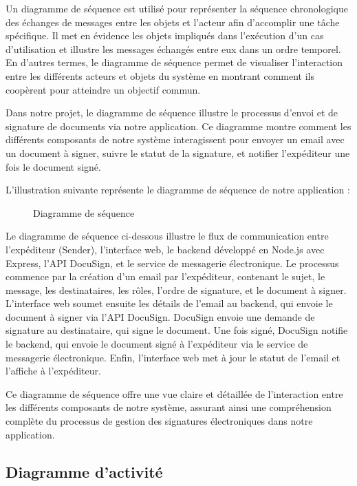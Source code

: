 Un diagramme de séquence est utilisé pour représenter la séquence chronologique des échanges de messages entre les objets et l’acteur afin d’accomplir une tâche spécifique. Il met en évidence les objets impliqués dans l’exécution d’un cas d’utilisation et illustre les messages échangés entre eux dans un ordre temporel. En d’autres termes, le diagramme de séquence permet de visualiser l’interaction entre les différents acteurs et objets du système en montrant comment ils coopèrent pour atteindre un objectif commun.

Dans notre projet, le diagramme de séquence illustre le processus d'envoi et de signature de documents via notre application. Ce diagramme montre comment les différents composants de notre système interagissent pour envoyer un email avec un document à signer, suivre le statut de la signature, et notifier l'expéditeur une fois le document signé.

L'illustration suivante représente le diagramme de séquence de notre application :

\begin{figure}[H]
\begin{center}
\end{center}
\caption{Diagramme de séquence}
\end{figure}


Le diagramme de séquence ci-dessous illustre le flux de communication entre l'expéditeur (Sender), l'interface web, le backend développé en Node.js avec Express, l'API DocuSign, et le service de messagerie électronique. Le processus commence par la création d'un email par l'expéditeur, contenant le sujet, le message, les destinataires, les rôles, l'ordre de signature, et le document à signer. L'interface web soumet ensuite les détails de l'email au backend, qui envoie le document à signer via l'API DocuSign. DocuSign envoie une demande de signature au destinataire, qui signe le document. Une fois signé, DocuSign notifie le backend, qui envoie le document signé à l'expéditeur via le service de messagerie électronique. Enfin, l'interface web met à jour le statut de l'email et l'affiche à l'expéditeur.


Ce diagramme de séquence offre une vue claire et détaillée de l'interaction entre les différents composants de notre système, assurant ainsi une compréhension complète du processus de gestion des signatures électroniques dans notre application.

\subsection{ Diagramme d’activité
}

